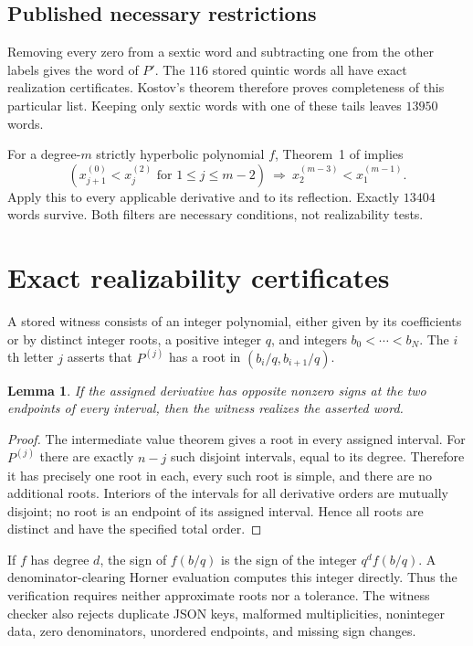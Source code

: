 \documentclass[11pt]{article}
\newtheorem{lemma}[theorem]{Lemma}
\theoremstyle{definition}
\begin{document}
\subsection{Published necessary restrictions}
Removing every zero from a sextic word and subtracting one from the other
labels gives the word of $P'$. The $116$ stored quintic words all have exact
realization certificates. Kostov's theorem \cite[Theorem~2]{Kostov2002}
therefore proves completeness of this particular list. Keeping only
sextic words with one of these tails leaves $13950$ words.

For a degree-$m$ strictly hyperbolic polynomial $f$, Theorem~1 of
\cite{KostovShapiro2002} implies
\begin{equation}\label{eq:ks}
 \left(x^{(0)}_{j+1}<x^{(2)}_j\text{ for }1\le j\le m-2\right)
 \ \Longrightarrow\ x^{(m-3)}_2<x^{(m-1)}_1.
\end{equation}
Apply this to every applicable derivative and to its reflection. Exactly
$13404$ words survive. Both filters are necessary conditions, not
realizability tests.

\section{Exact realizability certificates}

A stored witness consists of an integer polynomial, either given by its
coefficients or by distinct integer roots, a positive integer $q$, and
integers $b_0<\cdots<b_N$. The $i$th letter $j$ asserts that $P^{(j)}$
has a root in $(b_i/q,b_{i+1}/q)$.

\begin{lemma}\label{lem:witness}
If the assigned derivative has opposite nonzero signs at the two
endpoints of every interval, then the witness realizes the asserted word.
\end{lemma}
\begin{proof}
The intermediate value theorem gives a root in every assigned interval.
For $P^{(j)}$ there are exactly $n-j$ such disjoint intervals, equal to
its degree. Therefore it has precisely one root in each, every such root
is simple, and there are no additional roots. Interiors of the intervals
for all derivative orders are mutually disjoint; no root is an endpoint
of its assigned interval. Hence all roots are distinct and have the
specified total order.
\end{proof}

If $f$ has degree $d$, the sign of $f(b/q)$ is the sign of the integer
$q^d f(b/q)$. A denominator-clearing Horner evaluation computes this
integer directly. Thus the verification requires neither approximate
roots nor a tolerance. The witness checker also rejects duplicate
JSON keys, malformed multiplicities, noninteger data, zero denominators,
unordered endpoints, and missing sign changes.
\end{document}
